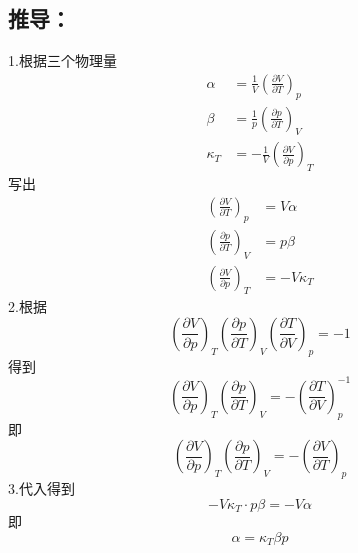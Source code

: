 \subsection{推导：}
1.根据三个物理量
\begin{equation}
    \begin{aligned}
        \alpha &=\frac{1}{V}\left( \frac{\partial V}{\partial T} \right) _p
\\
\beta &=\frac{1}{p}\left( \frac{\partial p}{\partial T} \right) _V
\\
\kappa _T&=-\frac{1}{V}\left( \frac{\partial V}{\partial p} \right) _T
    \end{aligned}
\end{equation}
写出
\begin{equation}
    \begin{aligned}
        \left( \frac{\partial V}{\partial T} \right) _p&=V\alpha 
\\
\left( \frac{\partial p}{\partial T} \right) _V&=p\beta 
\\
\left( \frac{\partial V}{\partial p} \right) _T&=-V\kappa _T
    \end{aligned}
\end{equation}
2.根据
\begin{equation}
    \left( \frac{\partial V}{\partial p} \right) _T\left( \frac{\partial p}{\partial T} \right) _V\left( \frac{\partial T}{\partial V} \right) _p=-1
\end{equation}
得到
\begin{equation}
    \left( \frac{\partial V}{\partial p} \right) _T\left( \frac{\partial p}{\partial T} \right) _V=-\left( \frac{\partial T}{\partial V} \right) _{p}^{-1}
\end{equation}
即
\begin{equation}
    \left( \frac{\partial V}{\partial p} \right) _T\left( \frac{\partial p}{\partial T} \right) _V=-\left( \frac{\partial V}{\partial T} \right) _p
\end{equation}
3.代入得到
\begin{equation}
    -V\kappa _T\cdot p\beta =-V\alpha 
\end{equation}
即
\begin{equation}
    \alpha =\kappa _T\beta p
\end{equation}



